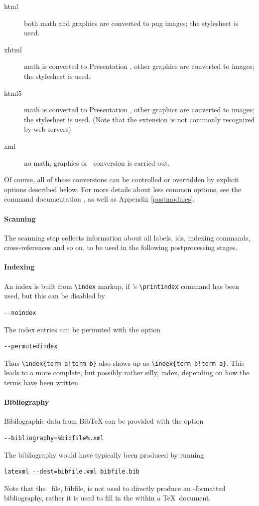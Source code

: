 \documentclass{book}
\begin{document}
\begin{description}
 \item[html] both math and graphics are converted to png images;
    the stylesheet  is used.
 \item[xhtml] math is converted to Presentation \MathML, other graphics are converted to images;
    the stylesheet   is used.
 \item[html5] math is converted to Presentation \MathML, other graphics are converted to images;
    the stylesheet  is used.
    (Note that the extension  is not commonly recognized by web servers)
 \item[xml] no math, graphics or \XSLT\ conversion is carried out.
\end{description}
Of course, all of these conversions can be controlled or overridden
by explicit options described below.
For more details about less common options, see the command
documentation , as well as Appendix \ref{postmodules}.

\paragraph{Scanning}
The scanning step collects information about all labels, ids,
indexing commands, cross-references and so on, to be used
in the following postprocessing stages.

\paragraph{Indexing}
An index is built from \verb|\index| markup, if
's \verb|\printindex| command has been used,
but this can be disabled by
\begin{lstlisting}[style=shell]
--noindex
\end{lstlisting}
The index entries can be permuted with the option
\begin{lstlisting}[style=shell]
--permutedindex
\end{lstlisting}
Thus \verb|\index{term a!term b}| also shows up as \verb|\index{term b!term a}|.
This leads to a more complete, but possibly rather silly, index,
depending on how the terms have been written.

\paragraph{Bibliography}
Bibilographic data from BibTeX can be provided with the option
\begin{lstlisting}[style=shell]
--bibliography=%bibfile%.xml
\end{lstlisting}
The bibliography would have typically been produced by running
\begin{lstlisting}[style=shell]
latexml --dest=bibfile.xml bibfile.bib
\end{lstlisting}
Note that the \XML\ file, bibfile, is not used to directly produce
an \HTML-formatted bibliography, rather it is used to fill in
the \verb|| within a \TeX\ document.
\end{document}
